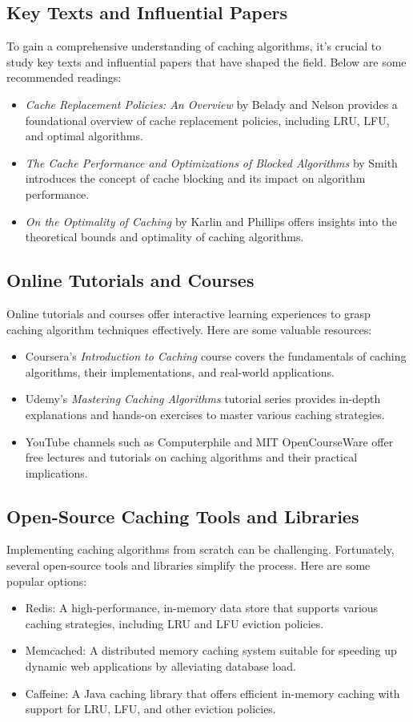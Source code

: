 \documentclass[12pt]{book} %
\begin{document}
\subsection{Key Texts and Influential Papers}
To gain a comprehensive understanding of caching algorithms, it's crucial to study key texts and influential papers that have shaped the field. Below are some recommended readings:
\begin{itemize}
    \item \textit{Cache Replacement Policies: An Overview} by Belady and Nelson provides a foundational overview of cache replacement policies, including LRU, LFU, and optimal algorithms.
    \item \textit{The Cache Performance and Optimizations of Blocked Algorithms} by Smith introduces the concept of cache blocking and its impact on algorithm performance.
    \item \textit{On the Optimality of Caching} by Karlin and Phillips offers insights into the theoretical bounds and optimality of caching algorithms.
\end{itemize}

\subsection{Online Tutorials and Courses}
Online tutorials and courses offer interactive learning experiences to grasp caching algorithm techniques effectively. Here are some valuable resources:
\begin{itemize}
    \item Coursera's \textit{Introduction to Caching} course covers the fundamentals of caching algorithms, their implementations, and real-world applications.
    \item Udemy's \textit{Mastering Caching Algorithms} tutorial series provides in-depth explanations and hands-on exercises to master various caching strategies.
    \item YouTube channels such as Computerphile and MIT OpenCourseWare offer free lectures and tutorials on caching algorithms and their practical implications.
\end{itemize}

\subsection{Open-Source Caching Tools and Libraries}
Implementing caching algorithms from scratch can be challenging. Fortunately, several open-source tools and libraries simplify the process. Here are some popular options:
\begin{itemize}
    \item Redis: A high-performance, in-memory data store that supports various caching strategies, including LRU and LFU eviction policies.
    \item Memcached: A distributed memory caching system suitable for speeding up dynamic web applications by alleviating database load.
    \item Caffeine: A Java caching library that offers efficient in-memory caching with support for LRU, LFU, and other eviction policies.
\end{itemize}
\end{document}

